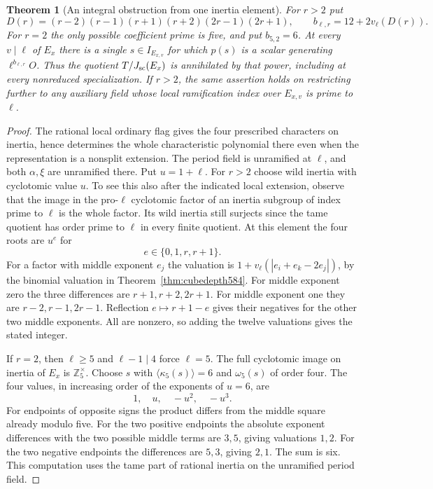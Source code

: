 \documentclass[a4paper,11pt]{article}
\newtheorem{theorem}[proposition]{Theorem}
\theoremstyle{definition}
\theoremstyle{remark}
\newcommand{\ZZ}{\mathbb Z}\newcommand{\ord}{\operatorname{ord}}
\numberwithin{equation}{section}
\begin{document}
\begin{theorem}[An integral obstruction from one inertia element]
\leavevmode\label{thm:unorderedcube588}
For \(r>2\) put
\[
    D(r)=(r-2)(r-1)(r+1)(r+2)(2r-1)(2r+1),\qquad
    b_{\ell,r}=12+2v_\ell(D(r)).
\]
For \(r=2\) the only possible coefficient prime is five, and
put \(b_{5,2}=6\). At every \(v\mid\ell\) of \(E_x\) there is
a single \(s\in I_{E_{x,v}}\) for which \(p(s)\) is a scalar
generating \(\ell^{b_{\ell,r}}O\). Thus the quotient
\(T/J_{\rm sc}(E_x)\) is annihilated by that power, including
at every nonreduced specialization. If \(r>2\), the same
assertion holds on restricting further to any auxiliary field
whose local ramification index over \(E_{x,v}\) is prime to
\(\ell\).
\end{theorem}
\begin{proof}
The rational local ordinary flag gives the four prescribed
characters on inertia, hence determines the whole
characteristic polynomial there even when the representation
is a nonsplit extension. The period field is unramified
at \(\ell\), and both \(\alpha,\xi\) are unramified there.
Put \(u=1+\ell\). For \(r>2\) choose wild inertia with
cyclotomic value \(u\). To see this also after the indicated
local extension, observe that the image in the pro-\(\ell\)
cyclotomic factor of an inertia subgroup of index prime to
\(\ell\) is the whole factor. Its wild inertia still
surjects since the tame quotient has order prime to \(\ell\)
in every finite quotient. At this element the four roots are
\(u^e\) for
\[
                            e\in\{0,1,r,r+1\}.
\]
For a factor with middle exponent \(e_j\) the valuation is
\(1+v_\ell(|e_i+e_k-2e_j|)\), by the binomial valuation in
Theorem~\ref{thm:cubedepth584}. For middle exponent zero the
three differences are \(r+1,r+2,2r+1\). For middle exponent
one they are \(r-2,r-1,2r-1\). Reflection
\(e\mapsto r+1-e\) gives their negatives for the other two
middle exponents. All are nonzero, so adding the twelve
valuations gives the stated integer.

If \(r=2\), then \(\ell\ge5\) and \(\ell-1\mid4\) force
\(\ell=5\). The full cyclotomic image on inertia of \(E_x\)
is \(\ZZ_5^\times\). Choose \(s\) with
\(\langle\kappa_5(s)\rangle=6\) and \(\omega_5(s)\) of
order four. The four values, in increasing order of the
exponents of \(u=6\), are
\[
                              1,\quad u,\quad -u^2,\quad -u^3.
\]
For endpoints of opposite signs the product differs from
the middle square already modulo five. For the two positive
endpoints the absolute exponent differences with the two
possible middle terms are \(3,5\), giving valuations \(1,2\).
For the two negative endpoints the differences are \(5,3\),
giving \(2,1\). The sum is six. This computation uses the
tame part of rational inertia on the unramified period field.
\end{proof}
\end{document}
